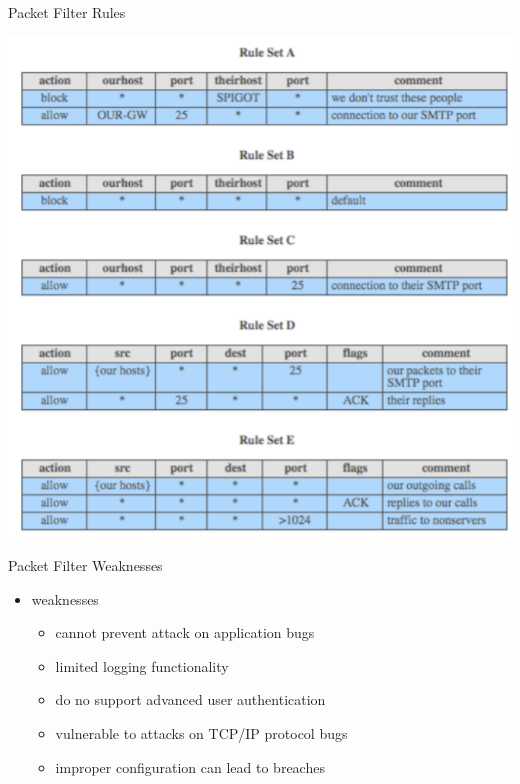 \documentclass{beamer}
\begin{document}
\begin{frame}{Packet Filter Rules}
  \begin{center}
    \includegraphics[width=0.6\linewidth]{filter-rules}
  \end{center}
\end{frame}

\begin{frame}{Packet Filter Weaknesses}
  \begin{itemize}
  \item weaknesses 
    \begin{itemize}
    \item cannot prevent attack on application bugs 
    \item limited logging functionality 
    \item do no support advanced user authentication 
    \item vulnerable to attacks on TCP/IP protocol bugs 
    \item improper configuration can lead to breaches
    \end{itemize}
  \end{itemize}
\end{frame}
\end{document}
